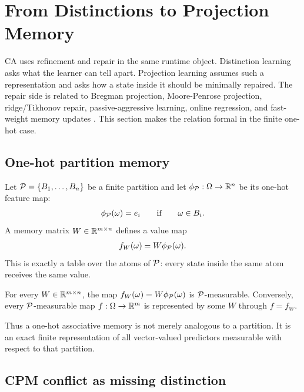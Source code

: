 \section{From Distinctions to Projection Memory}
\label{sec:projection-bridge}

CA uses refinement and repair in the same runtime object. Distinction learning asks what the learner can tell apart. Projection learning assumes such a representation and asks how a state inside it should be minimally repaired. The repair side is related to Bregman projection, Moore-Penrose projection, ridge/Tikhonov repair, passive-aggressive learning, online regression, and fast-weight memory updates \citep{bregman1967relaxation,penrose1955generalized,tikhonov1977solutions,hoerl1970ridge,crammer2006online,vovk1997competitive,ba2016using,schlag2021linear}. This section makes the relation formal in the finite one-hot case.

\subsection{One-hot partition memory}

Let $\mathcal{P}=\{B_1,\ldots,B_n\}$ be a finite partition and let $\phi_{\mathcal{P}}:\Omega\to\mathbb{R}^n$ be its one-hot feature map:
\begin{align*}
\phi_{\mathcal{P}}(\omega)=e_i\qquad \text{if}\qquad \omega\in B_i.
\end{align*}
A memory matrix $W\in\mathbb{R}^{m\times n}$ defines a value map
\begin{align*}
f_W(\omega)=W\phi_{\mathcal{P}}(\omega).
\end{align*}
This is exactly a table over the atoms of $\mathcal{P}$: every state inside the same atom receives the same value.

\begin{theorem}
\label{thm:one-hot-measurable:informal}
For every $W\in\mathbb{R}^{m\times n}$, the map $f_W(\omega)=W\phi_{\mathcal{P}}(\omega)$ is $\mathcal{P}$-measurable. Conversely, every $\mathcal{P}$-measurable map $f:\Omega\to\mathbb{R}^m$ is represented by some $W$ through $f=f_W$.
\end{theorem}

Thus a one-hot associative memory is not merely analogous to a partition. It is an exact finite representation of all vector-valued predictors measurable with respect to that partition.

\subsection{CPM conflict as missing distinction}


